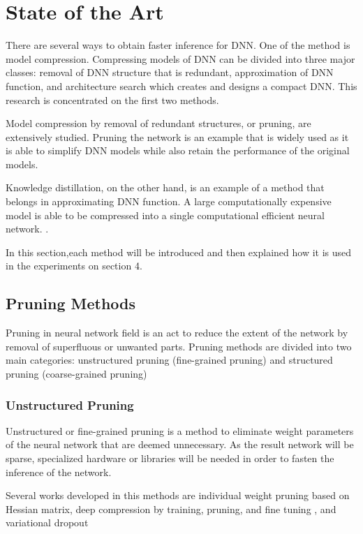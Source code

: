 

    \chapter{State of the Art}
	There are several ways to obtain faster inference for DNN. One of the method is model compression. Compressing models of DNN can be divided into three major classes: \cite{Wen2017LearningIS} removal of DNN structure that is redundant, approximation of DNN function, and architecture search which creates and designs a compact DNN. This research is concentrated on the first two methods.
	
	Model compression by removal of redundant structures, or pruning, are extensively studied. Pruning the network is an example that is widely used as it is able to simplify DNN models while also retain the performance of the original models. \cite{Tang2019BringingGN}
	
	Knowledge distillation, on the other hand, is an example of a method that belongs in approximating DNN function. A large computationally expensive model is able to be compressed into a single computational efficient neural network. \cite{Mirzadeh2019ImprovedKD}.
	
	In this section,each method will be introduced and then explained how it is used in the experiments on section 4. 
	
    \section{Pruning Methods}
    Pruning in neural network field is an act to reduce the extent of the network by removal of superfluous or unwanted parts. Pruning methods are divided into two main categories: unstructured pruning (fine-grained pruning) and structured pruning (coarse-grained pruning) \cite{8114708}
    
    \subsection{Unstructured Pruning}
    Unstructured or fine-grained pruning is a method to eliminate weight parameters of the neural network that are deemed unnecessary. As the result network will be sparse, specialized hardware or libraries will be needed in order to fasten the inference of the network.\cite{Liu2018RethinkingTV} 
    
    Several works developed in this methods are individual weight pruning based on Hessian matrix, \cite{NIPS1992_647} deep compression by training, pruning, and fine tuning \cite{Han2015DeepCC}, and variational dropout \cite{Molchanov2017VariationalDS}
    
